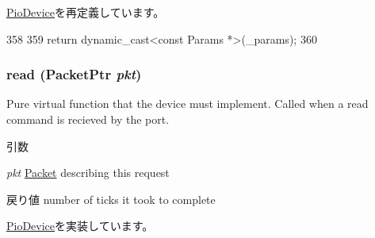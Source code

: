 \hyperlink{classPioDevice_acd3c3feb78ae7a8f88fe0f110a718dff}{PioDevice}を再定義しています。


\begin{DoxyCode}
358     {
359         return dynamic_cast<const Params *>(_params);
360     }
\end{DoxyCode}
\hypertarget{classPl111_a613ec7d5e1ec64f8d21fec78ae8e568e}{
\subsubsection[{read}]{ read ({\bf PacketPtr} {\em pkt})}}
\label{classPl111_a613ec7d5e1ec64f8d21fec78ae8e568e}
Pure virtual function that the device must implement. Called when a read command is recieved by the port. 
\begin{DoxyParams}{引数}
\item[{\em pkt}]\hyperlink{classPacket}{Packet} describing this request \end{DoxyParams}
\begin{DoxyReturn}{戻り値}
number of ticks it took to complete 
\end{DoxyReturn}


\hyperlink{classPioDevice_a842312590432036092c422c87a442358}{PioDevice}を実装しています。


